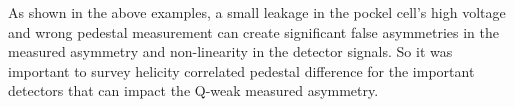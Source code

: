 As shown in the above examples, a small leakage in the pockel cell's high voltage and wrong pedestal measurement can create significant false asymmetries in the measured asymmetry and non-linearity in the detector signals. So it was important to survey helicity correlated pedestal difference for the important detectors that can impact the Q-weak measured asymmetry. 


%
%

